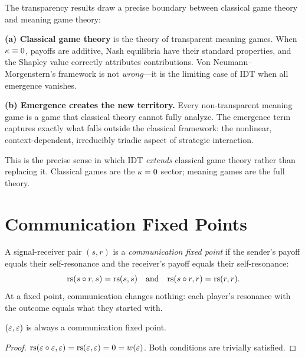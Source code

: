 \begin{interpretation}
The transparency results draw a precise boundary between classical game
theory and meaning game theory:

\textbf{(a) Classical game theory} is the theory of transparent meaning
games. When $\kappa \equiv 0$, payoffs are additive, Nash equilibria
have their standard properties, and the Shapley value correctly
attributes contributions. Von Neumann--Morgenstern's framework is not
\emph{wrong}---it is the limiting case of IDT when all emergence vanishes.

\textbf{(b) Emergence creates the new territory.} Every non-transparent
meaning game is a game that classical theory cannot fully analyze. The
emergence term captures exactly what falls outside the classical framework:
the nonlinear, context-dependent, irreducibly triadic aspect of strategic
interaction.

This is the precise sense in which IDT \emph{extends} classical game theory
rather than replacing it. Classical games are the $\kappa = 0$ sector;
meaning games are the full theory.
\end{interpretation}


\section{Communication Fixed Points}

\begin{definition}
A signal-receiver pair $(s, r)$ is a \emph{communication fixed point} if
the sender's payoff equals their self-resonance and the receiver's payoff
equals their self-resonance:
\[
\mathrm{rs}(s \circ r, s) = \mathrm{rs}(s, s) \quad \text{and} \quad
\mathrm{rs}(s \circ r, r) = \mathrm{rs}(r, r).
\]
At a fixed point, communication changes nothing: each player's resonance
with the outcome equals what they started with.
\end{definition}

\begin{theorem}
\label{thm:void-fixed}
$(\varepsilon, \varepsilon)$ is always a communication fixed point.
\end{theorem}

\begin{proof}
$\mathrm{rs}(\varepsilon \circ \varepsilon, \varepsilon) = \mathrm{rs}(\varepsilon, \varepsilon) = 0 = w(\varepsilon)$.
Both conditions are trivially satisfied.
\end{proof}


